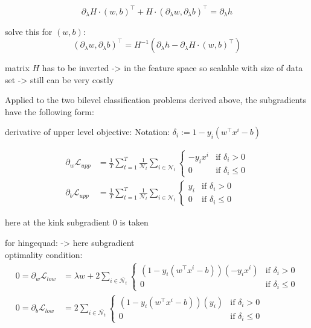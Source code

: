 \[ \partial_{\lambda} H\cdot (w,b)^{\top} + H \cdot(\partial_{\lambda} w, \partial_{\lambda} b)^{\top} = \partial_{\lambda} h  \]

solve this for \((w,b)\):
\[ (\partial_{\lambda} w, \partial_{\lambda}b)^{\top} = H^{-1}\left(\partial_{\lambda}h-\partial_{\lambda} H \cdot(w,b)^{\top}\right) \]

matrix \(H\) has to be inverted -> in the feature space so scalable with size of data set -> still can be very costly \cite{Moore2011}

Applied to the two bilevel classification problems derived above, the subgradients have the following form:

derivative of upper level objective:
Notation: \(\delta_i := 1-y_i(w^{\top}x^i-b)\)

\begin{align}
	\partial_{w}\mathcal{L}_{upp}&= \frac{1}{T}\sum_{t=1}^T\frac{1}{\mathcal{N}_t}\sum_{i \in \mathcal{N}_t}{\left\{\begin{array}{cl} -y_ix^i & \text{if } \delta_i >0 \\ 0 & \text{if } \delta_i \leq 0 \end{array} \right.} \\
	\partial_{b}\mathcal{L}_{upp}&= \frac{1}{T}\sum_{t=1}^T\frac{1}{\mathcal{N}_t}\sum_{i \in \mathcal{N}_t}{\left\{\begin{array}{cl} y_i & \text{if } \delta_i >0 \\ 0 & \text{if } \delta_i \leq 0 \end{array} \right.}
	\end{align}
	
	here at the kink subgradient 0 is taken

for hingequad: -> here subgradient \\
optimality condition:
\begin{align}
	0 = \partial_{w}\mathcal{L}_{low} &= \lambda w+2\sum_{i \in \bar{\mathcal{N}_t}}{\left\{\begin{array}{cl} (1-y_i(w^{\top}x^i-b))(-y_ix^i) & \text{if } \delta_i >0 \\ 0 & \text{if } \delta_i \leq 0 \end{array} \right.} \\
	0 = \partial_b\mathcal{L}_{low} &= 2\sum_{i \in \bar{\mathcal{N}_t}}{\left\{\begin{array}{cl} (1-y_i(w^{\top}x^i-b))(y_i) & \text{if } \delta_i >0 \\ 0 & \text{if } \delta_i \leq 0 \end{array} \right.}
	\end{align}
	
